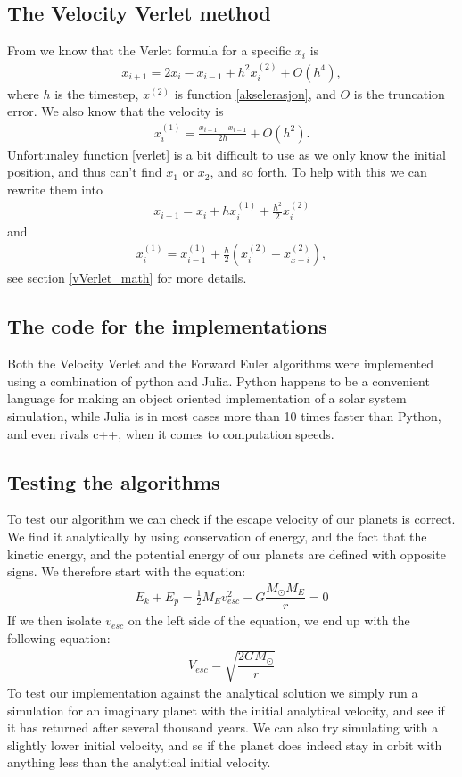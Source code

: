 \documentclass[a4paper]{article}
\begin{document}
\subsection{The Velocity Verlet method}
From \cite{lecture notes} we know that the Verlet formula for a specific $x_i$ is
\begin{align}
x_{i+1} = 2x_i - x_{i-1} + h^2 x_i^{(2)} + O(h^4) \label{verlet},
\end{align}
where $h$ is the timestep, $x^{(2)}$ is function \ref{akselerasjon}, and $O$ is the truncation error. We also know that the velocity is
\begin{align}
x_i^{(1)} = \frac{x_{i+1} - x_{i-1}}{2h} + O(h^2). \label{vVerlet}
\end{align}
Unfortunaley function \ref{verlet} is a bit difficult to use as we only know the initial position, and thus can't find $x_1$ or $x_2$, and so forth. To help with this we can rewrite them into
\begin{align}
x_{i+1} = x_i + hx_i^{(1)} + \frac{h^2}{2}x_i^{(2)} \label{velVerlet}
\end{align}
and
\begin{align}
x_i^{(1)} = x_{i-1}^{(1)} + \frac{h}{2} \left( x_i^{(2)} + x_{x-i}^{(2)} \right) \label{VvelVerlet},
\end{align}
see section \ref{vVerlet_math} for more details.
\subsection{The code for the implementations}
Both the Velocity Verlet and the Forward Euler algorithms were implemented using a combination of python and Julia. Python happens to be a convenient language for making an object oriented implementation of a solar system simulation, while Julia is in most cases more than 10 times faster than Python, and even rivals c++, when it comes to computation speeds.
\subsection{Testing the algorithms}
To test our algorithm we can check if the escape velocity of our planets is correct. We find it analytically by using conservation of energy, and the fact that the kinetic energy, and the potential energy of our planets are defined with opposite signs. We therefore start with the equation:
\begin{align*}
E_k + E_p = \tfrac{1}{2}M_{E}v_{esc}^{2} - G\dfrac{M_{\odot}M_{E}}{r} = 0
\end{align*}
If we then isolate $v_{esc}$ on the left side of the equation, we end up with the following equation: 
\begin{align}
V_{esc} = \sqrt{\dfrac{2GM_{\odot}}{r}}
\end{align}
To test our implementation against the analytical solution we simply run a simulation for an imaginary planet with the initial analytical velocity, and see if it has returned after several thousand years. We can also try simulating with a slightly lower initial velocity, and se if the planet does indeed stay in orbit with anything less than the analytical initial velocity.
\end{document}
